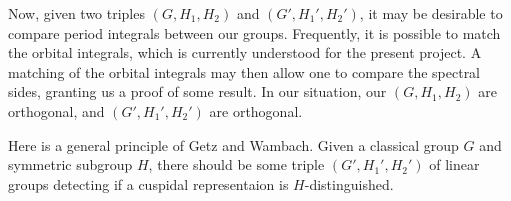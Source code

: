 \documentclass{article}
\begin{document}
Now, given two triples $(G,H_1,H_2)$ and $(G',H_1',H_2')$, it may be desirable to compare period integrals between our groups. Frequently, it is possible to match the orbital integrals, which is currently understood for the present project. A matching of the orbital integrals may then allow one to compare the spectral sides, granting us a proof of some result. In our situation, our $(G,H_1,H_2)$ are orthogonal, and $(G',H_1',H_2')$ are orthogonal.
\begin{remark}
	Here is a general principle of Getz and Wambach. Given a classical group $G$ and symmetric subgroup $H$, there should be some triple $(G',H_1',H_2')$ of linear groups detecting if a cuspidal representaion is $H$-distinguished.
\end{remark}
\end{document}
